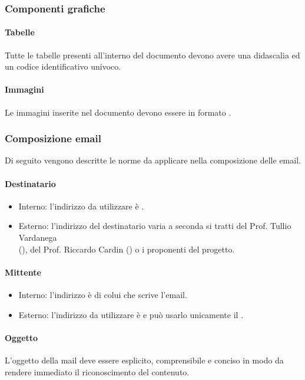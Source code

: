 \subsubsection{Componenti grafiche}
\paragraph{Tabelle}
Tutte le tabelle presenti all'interno del documento devono avere una didascalia
ed un codice identificativo univoco.

\paragraph{Immagini}
Le immagini inserite nel documento devono essere in formato .

\subsubsection{Composizione email}
Di seguito vengono descritte le norme da applicare nella composizione delle email.

\paragraph{Destinatario}
\begin{itemize}
  \item Interno: l'indirizzo da utilizzare è \email.
  \item Esterno: l'indirizzo del destinatario varia a seconda si tratti del Prof. Tullio Vardanega \\ (), del Prof. Riccardo Cardin () o i proponenti del progetto.
\end{itemize}

\paragraph{Mittente}
\begin{itemize}
  \item Interno: l'indirizzo è di colui che scrive l'email.
  \item Esterno: l'indirizzo da utilizzare è \email e può usarlo unicamente il \Pm.
\end{itemize}

\paragraph{Oggetto}
L'oggetto della mail deve essere esplicito, comprensibile e conciso in modo da rendere
immediato il riconoscimento del contenuto.

